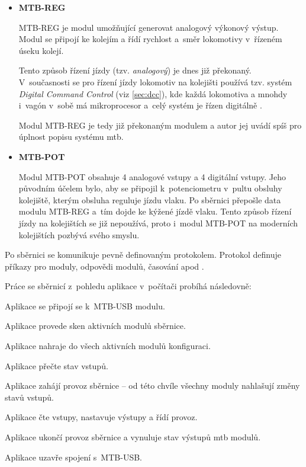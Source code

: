 \begin{itemize}
\item \textbf{MTB-REG}

	MTB-REG je modul umožňující generovat analogový výkonový výstup. Modul se
	připojí ke kolejím a řídí rychlost a~směr lokomotivy v~řízeném úseku kolejí.

	Tento způsob řízení jízdy (tzv. \textit{analogový}) je dnes již překonaný.
	V~současnosti se pro řízení jízdy lokomotiv na kolejišti používá tzv. systém
	\textit{Digital Command Control} (viz \ref{sec:dcc}), kde každá lokomotiva
	a mnohdy i~vagón v~sobě má mikroprocesor a~celý systém je řízen
	digitálně \cite{dcc_intro:web}.

	Modul MTB-REG je tedy již překonaným modulem a autor jej uvádí spíš pro
	úplnost popisu systému \gls{mtb}.

\item \textbf{MTB-POT}

	Modul MTB-POT obsahuje 4 analogové vstupy a 4 digitální vstupy. Jeho
	původním účelem bylo, aby se připojil k~potenciometru v~pultu obsluhy
	kolejiště, kterým obsluha reguluje jízdu vlaku. Po sběrnici přepošle data
	modulu MTB-REG a~tím dojde ke kýžené jízdě vlaku. Tento způsob řízení jízdy
	na kolejištích se již nepoužívá, proto i~modul MTB-POT na moderních
	kolejištích pozbývá svého smyslu.

\end{itemize}

Po sběrnici se komunikuje pevně definovaným protokolem.  Protokol definuje
příkazy pro moduly, odpovědi modulů, časování apod \cite{mtbbus-specs}.

Práce se sběrnicí z~pohledu aplikace v~počítači probíhá následovně:

\begin{compactenum}
\item Aplikace se připojí se k~MTB-USB modulu.
\item Aplikace provede sken aktivních modulů sběrnice.
\item Aplikace nahraje do všech aktivních modulů konfiguraci.
\item Aplikace přečte stav vstupů.
\item Aplikace zahájí provoz sběrnice – od této chvíle všechny moduly nahlašují
	změny stavů vstupů.
\item Aplikace čte vstupy, nastavuje výstupy a řídí provoz.
\item Aplikace ukončí provoz sběrnice a vynuluje stav výstupů \gls{mtb} modulů.
\item Aplikace uzavře spojení s~MTB-USB.
\end{compactenum}


